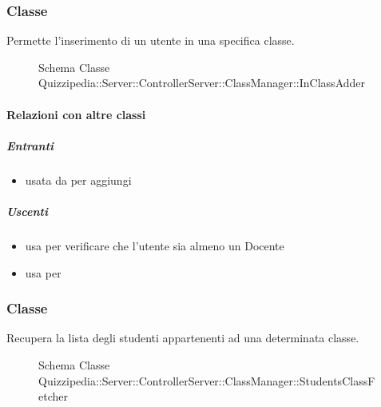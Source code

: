 \subsubsection{Classe }
Permette l'inserimento di un utente in una specifica classe.
\begin{figure}[H]
\centering
\noindent{}
\caption[Schema Classe InClassAdder]{Schema Classe Quizzipedia::Server::ControllerServer::ClassManager::InClassAdder}
\end{figure}
\paragraph{Relazioni con altre classi}
\subparagraph{Entranti}
\begin{itemize}
\item usata da  per aggiungi
\end{itemize}
\subparagraph{Uscenti}
\begin{itemize}
\item usa  per verificare che l'utente sia almeno un Docente
\item usa  per 
\end{itemize}
\subsubsection{Classe }
Recupera la lista degli studenti appartenenti ad una determinata classe.
\begin{figure}[H]
\centering
\noindent{}
\caption[Schema Classe StudentsClassFetcher]{Schema Classe Quizzipedia::Server::ControllerServer::ClassManager::StudentsClassFetcher}
\end{figure}
